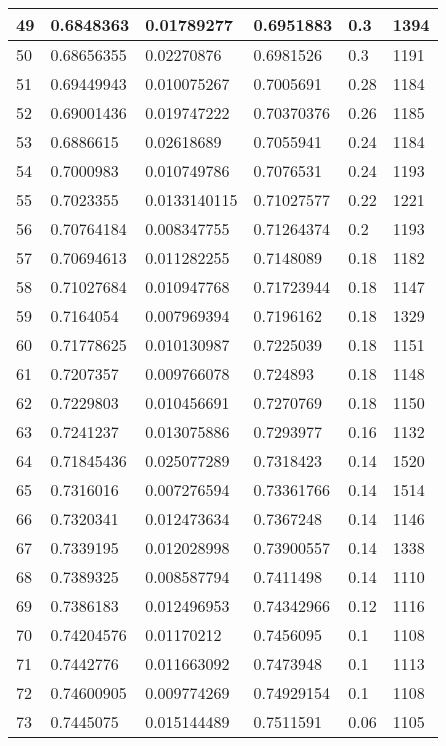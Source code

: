 \begin{longtable}{|l|l|l|l|l|l|}
49 & 0.6848363 & 0.01789277 & 0.6951883 & 0.3 & 1394 \\ \hline 
50 & 0.68656355 & 0.02270876 & 0.6981526 & 0.3 & 1191 \\ \hline 
51 & 0.69449943 & 0.010075267 & 0.7005691 & 0.28 & 1184 \\ \hline 
52 & 0.69001436 & 0.019747222 & 0.70370376 & 0.26 & 1185 \\ \hline 
53 & 0.6886615 & 0.02618689 & 0.7055941 & 0.24 & 1184 \\ \hline 
54 & 0.7000983 & 0.010749786 & 0.7076531 & 0.24 & 1193 \\ \hline 
55 & 0.7023355 & 0.0133140115 & 0.71027577 & 0.22 & 1221 \\ \hline 
56 & 0.70764184 & 0.008347755 & 0.71264374 & 0.2 & 1193 \\ \hline 
57 & 0.70694613 & 0.011282255 & 0.7148089 & 0.18 & 1182 \\ \hline 
58 & 0.71027684 & 0.010947768 & 0.71723944 & 0.18 & 1147 \\ \hline 
59 & 0.7164054 & 0.007969394 & 0.7196162 & 0.18 & 1329 \\ \hline 
60 & 0.71778625 & 0.010130987 & 0.7225039 & 0.18 & 1151 \\ \hline 
61 & 0.7207357 & 0.009766078 & 0.724893 & 0.18 & 1148 \\ \hline 
62 & 0.7229803 & 0.010456691 & 0.7270769 & 0.18 & 1150 \\ \hline 
63 & 0.7241237 & 0.013075886 & 0.7293977 & 0.16 & 1132 \\ \hline 
64 & 0.71845436 & 0.025077289 & 0.7318423 & 0.14 & 1520 \\ \hline 
65 & 0.7316016 & 0.007276594 & 0.73361766 & 0.14 & 1514 \\ \hline 
66 & 0.7320341 & 0.012473634 & 0.7367248 & 0.14 & 1146 \\ \hline 
67 & 0.7339195 & 0.012028998 & 0.73900557 & 0.14 & 1338 \\ \hline 
68 & 0.7389325 & 0.008587794 & 0.7411498 & 0.14 & 1110 \\ \hline 
69 & 0.7386183 & 0.012496953 & 0.74342966 & 0.12 & 1116 \\ \hline 
70 & 0.74204576 & 0.01170212 & 0.7456095 & 0.1 & 1108 \\ \hline 
71 & 0.7442776 & 0.011663092 & 0.7473948 & 0.1 & 1113 \\ \hline 
72 & 0.74600905 & 0.009774269 & 0.74929154 & 0.1 & 1108 \\ \hline 
73 & 0.7445075 & 0.015144489 & 0.7511591 & 0.06 & 1105 \\ \hline 

\end{longtable}
